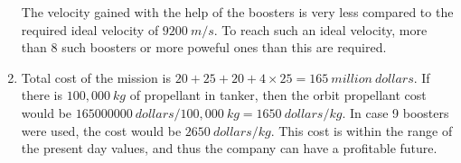 \begin{enumerate}[label=(\alph*)]
The velocity gained with the help of the boosters is very less compared to the required ideal velocity of $9200\: m/s$. To reach such an ideal velocity, more than 8 such boosters or more poweful ones than this are required.

\item
Total cost of the mission is $20+25+20+4\times25=165\: million\: dollars$. If there is $100,000\: kg$ of propellant in tanker, then the orbit propellant cost would be $165000000\: dollars/100,000\:kg=1650\: dollars/kg$. In case 9 boosters were used, the cost would be $2650\: dollars/kg$. This cost is within the range of the present day values, and thus the company can have a profitable future.

\end{enumerate}